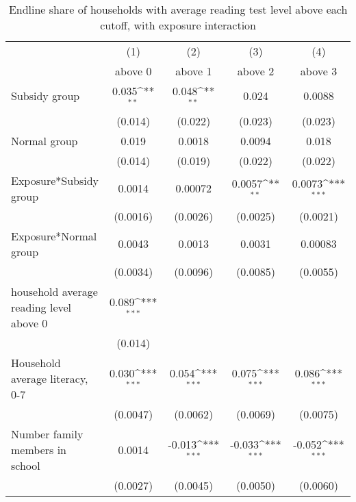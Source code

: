 \begin{table}[htbp]\centering
\def\sym#1{\ifmmode^{#1}\else\(^{#1}\)\fi}
\caption{Endline share of households with average reading test level above each cutoff, with exposure interaction}
\begin{tabular*}{1\hsize}{@{\hskip\tabcolsep\extracolsep\fill}l*{4}{c}}
\toprule
                &\multicolumn{1}{c}{(1)}&\multicolumn{1}{c}{(2)}&\multicolumn{1}{c}{(3)}&\multicolumn{1}{c}{(4)}\\
                &\multicolumn{1}{c}{above 0}&\multicolumn{1}{c}{above 1}&\multicolumn{1}{c}{above 2}&\multicolumn{1}{c}{above 3}\\
\midrule
Subsidy group   &    0.035\sym{**} &    0.048\sym{**} &    0.024         &   0.0088         \\
                &  (0.014)         &  (0.022)         &  (0.023)         &  (0.023)         \\
Normal group    &    0.019         &   0.0018         &   0.0094         &    0.018         \\
                &  (0.014)         &  (0.019)         &  (0.022)         &  (0.022)         \\
Exposure*Subsidy group&   0.0014         &  0.00072         &   0.0057\sym{**} &   0.0073\sym{***}\\
                & (0.0016)         & (0.0026)         & (0.0025)         & (0.0021)         \\
Exposure*Normal group&   0.0043         &   0.0013         &   0.0031         &  0.00083         \\
                & (0.0034)         & (0.0096)         & (0.0085)         & (0.0055)         \\
household average reading level above 0&    0.089\sym{***}&                  &                  &                  \\
                &  (0.014)         &                  &                  &                  \\
Household average literacy, 0-7&    0.030\sym{***}&    0.054\sym{***}&    0.075\sym{***}&    0.086\sym{***}\\
                & (0.0047)         & (0.0062)         & (0.0069)         & (0.0075)         \\
Number family members in school&   0.0014         &   -0.013\sym{***}&   -0.033\sym{***}&   -0.052\sym{***}\\
                & (0.0027)         & (0.0045)         & (0.0050)         & (0.0060)         \\

\end{tabular*}
\end{table}
